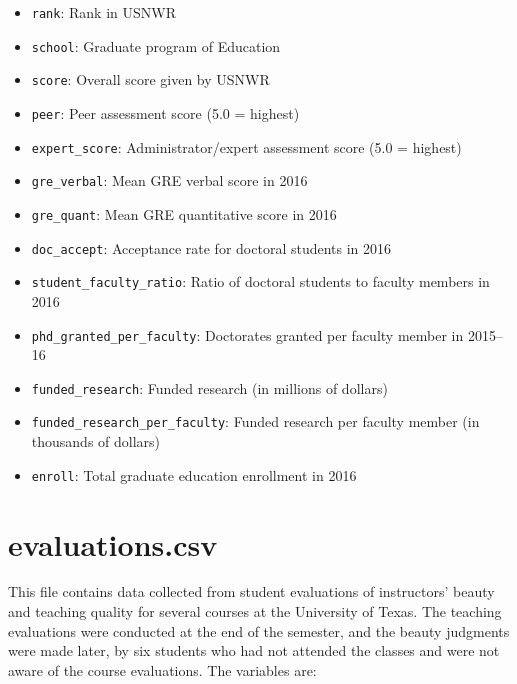 \documentclass[]{book}
\providecommand{\tightlist}{%
  \setlength{\itemsep}{0pt}\setlength{\parskip}{0pt}}
\begin{document}
\begin{itemize}
\tightlist
\item
  \texttt{rank}: Rank in USNWR
\item
  \texttt{school}: Graduate program of Education
\item
  \texttt{score}: Overall score given by USNWR
\item
  \texttt{peer}: Peer assessment score (5.0 = highest)
\item
  \texttt{expert\_score}: Administrator/expert assessment score (5.0 = highest)
\item
  \texttt{gre\_verbal}: Mean GRE verbal score in 2016
\item
  \texttt{gre\_quant}: Mean GRE quantitative score in 2016
\item
  \texttt{doc\_accept}: Acceptance rate for doctoral students in 2016
\item
  \texttt{student\_faculty\_ratio}: Ratio of doctoral students to faculty members in 2016
\item
  \texttt{phd\_granted\_per\_faculty}: Doctorates granted per faculty member in 2015--16
\item
  \texttt{funded\_research}: Funded research (in millions of dollars)
\item
  \texttt{funded\_research\_per\_faculty}: Funded research per faculty member (in thousands of dollars)
\item
  \texttt{enroll}: Total graduate education enrollment in 2016
\end{itemize}

\hypertarget{evaluations}{%
\section*{evaluations.csv}\label{evaluations}}

This file contains data collected from student evaluations of instructors' beauty and teaching quality for several courses at the University of Texas. The teaching evaluations were conducted at the end of the semester, and the beauty judgments were made later, by six students who had not attended the classes and were not aware of the course evaluations. The variables are:
\end{document}
